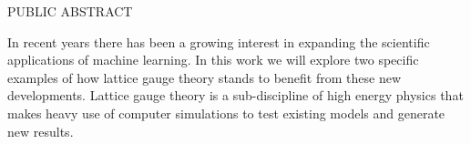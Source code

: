 \begin{doublespace}
\begin{tightcenter}
PUBLIC ABSTRACT
\mylinespacing
\end{tightcenter}

% 
In recent years there has been a growing interest in expanding the scientific applications of machine learning.
%
In this work we will explore two specific examples of how lattice gauge theory stands to benefit from these new
developments.
%
Lattice gauge theory is a sub-discipline of high energy physics that makes heavy use of computer simulations to test
existing models and generate new results.
%

\end{doublespace}
